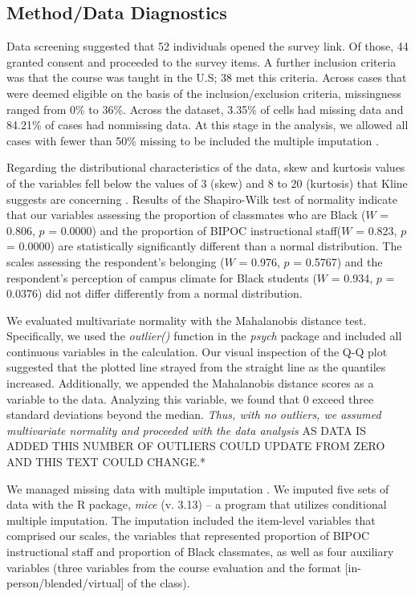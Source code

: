 \documentclass[
  english,
]{book}
\begin{document}
\hypertarget{methoddata-diagnostics}{%
\subsection{Method/Data Diagnostics}\label{methoddata-diagnostics}}

Data screening suggested that 52 individuals opened the survey link. Of those, 44 granted consent and proceeded to the survey items. A further inclusion criteria was that the course was taught in the U.S; 38 met this criteria. Across cases that were deemed eligible on the basis of the inclusion/exclusion criteria, missingness ranged from 0\% to 36\%. Across the dataset, 3.35\% of cells had missing data and 84.21\% of cases had nonmissing data. At this stage in the analysis, we allowed all cases with fewer than 50\% missing to be included the multiple imputation \citep{katitas_getting_2019}.

Regarding the distributional characteristics of the data, skew and kurtosis values of the variables fell below the values of 3 (skew) and 8 to 20 (kurtosis) that Kline suggests are concerning \citeyearpar{kline_principles_2016}. Results of the Shapiro-Wilk test of normality indicate that our variables assessing the proportion of classmates who are Black (\(W\) = 0.806, \(p\) = 0.0000) and the proportion of BIPOC instructional staff(\(W\) = 0.823, \(p\) = 0.0000) are statistically significantly different than a normal distribution. The scales assessing the respondent's belonging (\(W\) = 0.976, \(p\) = 0.5767) and the respondent's perception of campus climate for Black students (\(W\) = 0.934, \(p\) = 0.0376) did not differ differently from a normal distribution.

We evaluated multivariate normality with the Mahalanobis distance test. Specifically, we used the \emph{outlier()} function in the \emph{psych} package and included all continuous variables in the calculation. Our visual inspection of the Q-Q plot suggested that the plotted line strayed from the straight line as the quantiles increased. Additionally, we appended the Mahalanobis distance scores as a variable to the data. Analyzing this variable, we found that 0 exceed three standard deviations beyond the median. \emph{Thus, with no outliers, we assumed multivariate normality and proceeded with the data analysis} AS DATA IS ADDED THIS NUMBER OF OUTLIERS COULD UPDATE FROM ZERO AND THIS TEXT COULD CHANGE.*

We managed missing data with multiple imputation \citep{enders_multiple_2017, katitas_getting_2019}. We imputed five sets of data with the R package, \emph{mice} (v. 3.13) -- a program that utilizes conditional multiple imputation. The imputation included the item-level variables that comprised our scales, the variables that represented proportion of BIPOC instructional staff and proportion of Black classmates, as well as four auxiliary variables (three variables from the course evaluation and the format {[}in-person/blended/virtual{]} of the class).
\end{document}
